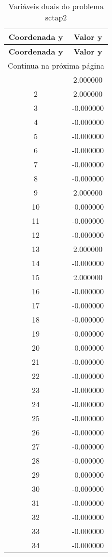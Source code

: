 \documentclass[12pt]{article}
\begin{document}
\begin{longtable}{@{}cc@{}}
\caption{Variáveis duais do problema sctap2} \\
\toprule
\textbf{Coordenada y} & \textbf{Valor y} \\
\midrule
\endfirsthead

\toprule
\textbf{Coordenada y} & \textbf{Valor y} \\
\midrule
\endhead

\midrule \multicolumn{2}{r}{{Continua na próxima página}} \\ \midrule
\endfoot

\bottomrule
\endlastfoot
1 & 2.000000 \\
2 & 2.000000 \\
3 & -0.000000 \\
4 & -0.000000 \\
5 & -0.000000 \\
6 & -0.000000 \\
7 & -0.000000 \\
8 & -0.000000 \\
9 & 2.000000 \\
10 & -0.000000 \\
11 & -0.000000 \\
12 & -0.000000 \\
13 & 2.000000 \\
14 & -0.000000 \\
15 & 2.000000 \\
16 & -0.000000 \\
17 & -0.000000 \\
18 & -0.000000 \\
19 & -0.000000 \\
20 & -0.000000 \\
21 & -0.000000 \\
22 & -0.000000 \\
23 & -0.000000 \\
24 & -0.000000 \\
25 & -0.000000 \\
26 & -0.000000 \\
27 & -0.000000 \\
28 & -0.000000 \\
29 & -0.000000 \\
30 & -0.000000 \\
31 & -0.000000 \\
32 & -0.000000 \\
33 & -0.000000 \\
34 & -0.000000 \\

\end{longtable}
\end{document}
